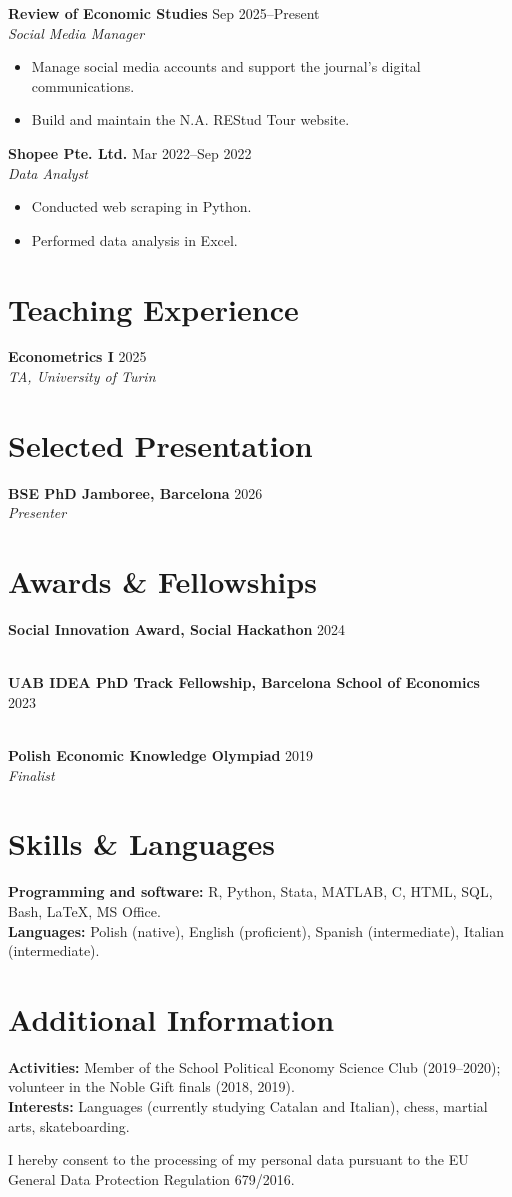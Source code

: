 \documentclass[11pt,letterpaper]{article}
\newcommand{\entry}[4]{%
    \textbf{#1} \hfill #2\\
    \textit{#3}\\
    #4
    \vspace{0.6em}
}
\begin{document}
\entry{Review of Economic Studies}{Sep 2025--Present}{Social Media Manager}{
\begin{itemize}
    \item Manage social media accounts and support the journal's digital communications.
    \item Build and maintain the N.A. REStud Tour website.
\end{itemize}
}

\entry{Shopee Pte. Ltd.}{Mar 2022--Sep 2022}{Data Analyst}{
\begin{itemize}
    \item Conducted web scraping in Python.
    \item Performed data analysis in Excel.
\end{itemize}
}

\section*{Teaching Experience}

\entry{Econometrics I}{2025}{TA, University of Turin}{}

\section*{Selected Presentation}

\entry{BSE PhD Jamboree, Barcelona}{2026}{Presenter}{}

\section*{Awards \& Fellowships}
\entry{Social Innovation Award, Social Hackathon}{2024}{}{}
\entry{UAB IDEA PhD Track Fellowship, Barcelona School of Economics}{2023}{}{}
\entry{Polish Economic Knowledge Olympiad}{2019}{Finalist}{}

\section*{Skills \& Languages}

\textbf{Programming and software:} R, Python, Stata, MATLAB, C, HTML, SQL, Bash, \LaTeX, MS Office.\\
\textbf{Languages:} Polish (native), English (proficient), Spanish (intermediate), Italian (intermediate).

\section*{Additional Information}

\textbf{Activities:} Member of the School Political Economy Science Club (2019--2020); volunteer in the Noble Gift finals (2018, 2019).\\
\textbf{Interests:} Languages (currently studying Catalan and Italian), chess, martial arts, skateboarding.

\vfill
{\small I hereby consent to the processing of my personal data pursuant to the EU General Data Protection Regulation 679/2016.}
\end{document}
